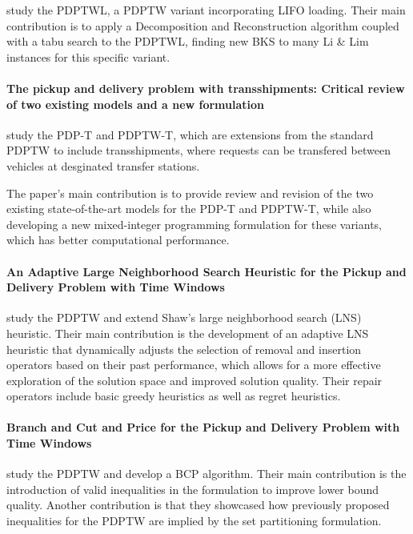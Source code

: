 \documentclass[preprint,11pt,authoryear]{elsarticle}
\begin{document}
\citet{liuFastDecompositionReconstruction2019} study the PDPTWL, a PDPTW variant incorporating LIFO loading. Their main contribution is to apply a Decomposition and Reconstruction algorithm coupled with a
tabu search to the PDPTWL, finding new BKS to many Li \& Lim instances for this specific variant.


\paragraph{\textbf{The pickup and delivery problem with transshipments: Critical review of two existing models and a new formulation}}

\citet{lyuPickupDeliveryProblem2023} study the PDP-T and PDPTW-T, which are extensions from the standard PDPTW to include transshipments, 
where requests can be transfered between vehicles at desginated transfer stations.

The paper's main contribution is to provide review and revision of the two existing state-of-the-art models for the PDP-T and PDPTW-T, 
while also developing a new mixed-integer programming formulation for these variants, which has better computational performance.


\paragraph{\textbf{An Adaptive Large Neighborhood Search Heuristic for the Pickup and Delivery Problem with Time Windows}}

\citet{ropkeAdaptiveLargeNeighborhood2006} study the PDPTW and extend Shaw's large neighborhood search (LNS) heuristic. 
Their main contribution is the development of an adaptive LNS heuristic that dynamically adjusts the selection of removal and insertion operators based on their past performance, 
which allows for a more effective exploration of the solution space and improved solution quality. Their repair operators include basic greedy heuristics as well as regret heuristics. 


\paragraph{\textbf{Branch and Cut and Price for the Pickup and Delivery Problem with Time Windows}}

\citet{ropkeBranchCutPrice2009} study the PDPTW and develop a BCP algorithm. Their main contribution is the introduction of valid inequalities in the formulation 
to improve lower bound quality. Another contribution is that they showcased how previously proposed inequalities for the PDPTW are implied by the set partitioning formulation.
\end{document}
